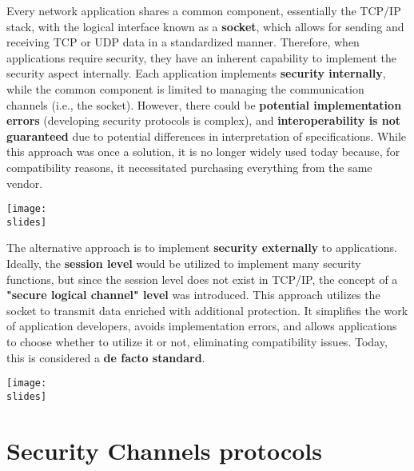 \vspace*{5mm}
\noindent
\begin{minipage}{0.65\textwidth}
    Every network application shares a common component, essentially the TCP/IP stack, with the logical interface known as a \textbf{socket}, which allows for sending and receiving TCP or UDP data in a standardized manner. Therefore, when applications require security, they have an inherent capability to implement the security aspect internally. Each application implements \textbf{security internally}, while the common component is limited to managing the communication channels
    (i.e., the socket). However, there could be \textbf{potential implementation errors} (developing security protocols is complex), and \textbf{interoperability is not guaranteed} due to potential differences in interpretation of specifications. While this approach was once a solution, it is no longer widely used today because, for compatibility reasons, it necessitated purchasing everything from the same vendor.
\end{minipage}
\hspace{0.05\textwidth}
\begin{minipage}{0.3\textwidth}
    \centering
    \texttt{[image: \\slides]}
\end{minipage}


\noindent
\begin{minipage}{0.65\textwidth}
    The alternative approach is to implement \textbf{security externally} to applications. Ideally, the \textbf{session level} would be utilized to implement many security functions, but since the session level does not exist in TCP/IP, the concept of a \textbf{"secure logical channel" level} was introduced. This approach utilizes the socket to transmit data enriched with additional protection. It simplifies the work of application developers, avoids implementation errors, and allows applications to choose whether to utilize it or not, eliminating compatibility issues. Today, this is considered a \textbf{de facto standard}.
\end{minipage}
\hspace{0.05\textwidth}
\begin{minipage}{0.3\textwidth}
    \centering
    \texttt{[image: \\slides]}
\end{minipage}


\section{Security Channels protocols}


